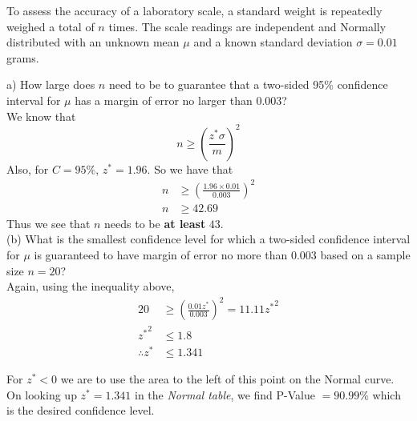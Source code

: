 \documentclass[boxes, qed]{homework}
\begin{document}
\newenvironment{amatrix}[1]{%
  \left[\begin{array}{@{}*{#1}{c}|c@{}}
}{%
  \end{array}\right]
}

\newenvironment{augmatrix}[1]{%
  \left[\begin{array}{#1}
}{%
  \end{array}\right]
}

\begin{problem}To assess the accuracy of a laboratory scale, a standard weight is repeatedly 
  weighed a total of $n$ times. The scale readings are independent and Normally distributed 
  with an unknown mean $\mu$ and a known standard deviation $\sigma = 0.01$ grams.
\end{problem}
\begin{solution}a) How large does $n$ need to be to guarantee that a two-sided 95\% 
  confidence interval for $\mu$ has a margin of error no larger than $0.003$?\\

  We know that
  $$n\ge(\frac{z^*\sigma}{m})^2$$
  Also, for $C=95\%$, $z^*=1.96$.
  So we have that
  \begin{align*}
    n &\ge (\frac{1.96\times{0.01}}{0.003})^2\\
    n &\ge 42.69
  \end{align*}
  Thus we see that $n$ needs to be \textbf{at least} $\boxed{43}$.\\
  
  (b) What is the smallest confidence level for which a two-sided confidence interval for $\mu$ 
  is guaranteed to have margin of error no more than $0.003$ based on a sample size $n = 20$?\\
  
  Again, using the inequality above, 
  \begin{align*}
    20 &\ge (\frac{0.01z^*}{0.003})^2
    = 11.11{z^*}^2\\
    {z^*}^2 &\le 1.8\\
    \therefore z^* &\le 1.341
  \end{align*}

  For $z^*<0$ we are to use the area to the left of this point on the Normal curve.
  On looking up $z^*=1.341$ in the \textit{Normal table}, we find P-Value $=90.99\%$
  which is the desired confidence level.
\end{solution}
\end{document}
